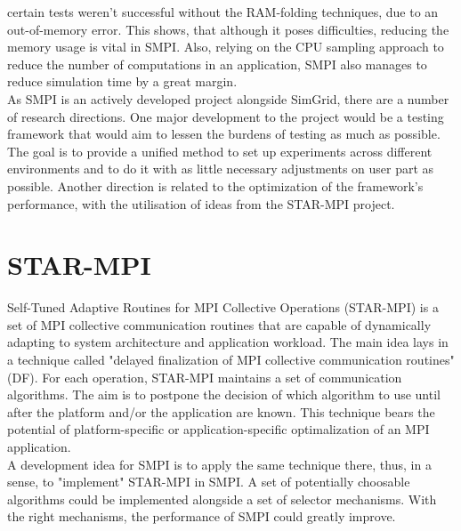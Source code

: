 certain tests weren't successful without the RAM-folding techniques,
due to an out-of-memory error. This shows, that although it poses
difficulties, reducing the memory usage is vital in SMPI. Also,
relying on the CPU sampling approach to reduce the number of
computations in an application, SMPI also manages to reduce simulation
time by a great margin.\\
As SMPI is an actively developed project alongside SimGrid, there are
a number of research directions. One major development to the
project would be a testing framework that would aim to lessen the
burdens of testing as much as possible. The goal is to provide a
unified method to set up experiments across different environments and
to do it with as little necessary adjustments on user part as
possible. Another direction is related to the optimization of the
framework's performance, with the utilisation of ideas from the
STAR-MPI project.
\section{STAR-MPI}
Self-Tuned Adaptive Routines for MPI Collective Operations (STAR-MPI)
is a set of MPI collective communication routines that are capable of
dynamically adapting to system architecture and application
workload. The main idea lays in a technique called "delayed
finalization of MPI collective communication routines" (DF). For each
operation, STAR-MPI maintains a set of communication algorithms. The
aim is to postpone the decision of which algorithm to use until after
the platform and/or the application are known. This technique bears
the potential of platform-specific or application-specific
optimalization of an MPI application.\cite{fyl06}\\
A development idea for SMPI is to apply the same technique there,
thus, in a sense, to "implement" STAR-MPI in SMPI. A set of
potentially choosable algorithms could be implemented alongside a set
of selector mechanisms. With the right mechanisms, the performance of
SMPI could greatly improve.
